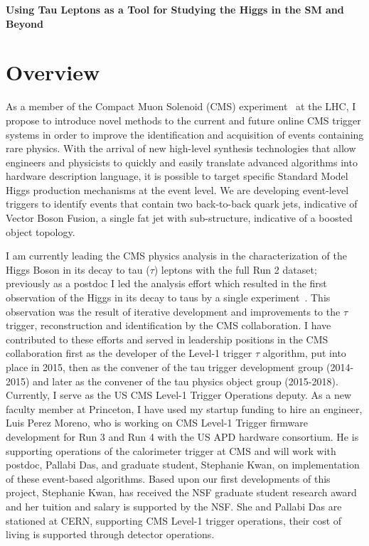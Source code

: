 \documentclass[preprint,12pt]{elsarticle}
\begin{document}





\noindent
\textbf{Using Tau Leptons as a Tool for Studying the Higgs in the SM and Beyond}

\section{Overview}
As a member of the Compact Muon Solenoid (CMS) experiment~\cite{CMS-JINST} at the LHC, 
I propose to introduce novel methods to the current and future online CMS trigger systems 
in order to improve the identification and acquisition of events containing rare physics. 
With the arrival of new high-level synthesis technologies that allow engineers and 
physicists to quickly and easily translate advanced algorithms into hardware 
description language, it is possible to target specific Standard Model Higgs
production mechanisms at the event level. We are developing event-level triggers 
to identify events that contain two back-to-back quark jets, indicative of 
Vector Boson Fusion, a single fat jet with sub-structure, indicative of a boosted
object topology. %

I am currently leading the CMS physics analysis in the characterization of the Higgs 
Boson in its decay to tau ($\tau$) leptons with the full Run 2 dataset; previously as 
a postdoc I led the analysis effort which resulted in the first observation of the 
Higgs in its decay to taus by a single experiment~\cite{HIG16043}. This observation was the 
result of iterative development and improvements to the $\tau$ trigger, reconstruction 
and identification by the CMS collaboration. I have contributed to these efforts and served 
in leadership positions in the CMS collaboration first as the developer of the Level-1 
trigger $\tau$ algorithm, put into place in 2015, then as the convener of the tau trigger
development group (2014-2015) and later as the convener of the tau physics object group 
(2015-2018). Currently, I serve as the US CMS Level-1 Trigger Operations deputy. 
As a new faculty member at Princeton, I have used my startup funding to hire an 
engineer, Luis Perez Moreno, who is working on CMS Level-1 Trigger firmware development
for Run 3 and Run 4 with the US APD hardware consortium. He is supporting operations 
of the calorimeter trigger at 
CMS and will work with postdoc, Pallabi Das, and graduate student, Stephanie Kwan, on
implementation of these event-based algorithms. Based upon our first developments of
this project, Stephanie Kwan, has received the NSF graduate student research award
and her tuition and salary is supported by the NSF. She and Pallabi Das are stationed
at CERN, supporting CMS Level-1 trigger operations, their cost of living is supported 
through detector operations.
\end{document}
